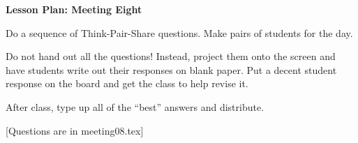 \documentclass[12pt]{amsart}
\theoremstyle{definition}
\begin{document}
\begin{center}
\textbf{\Huge
Lesson Plan: Meeting Eight
}
\end{center}
\vspace{.5in}

Do a sequence of Think-Pair-Share questions. 
Make pairs of students for the day.

Do not hand out all the questions!
Instead, project them onto the screen and have students write out their responses on blank paper. 
Put a decent student response on the board and get the class to help revise it.

After class, type up all of the ``best'' answers and distribute.

[Questions are in meeting08.tex]
\end{document}
